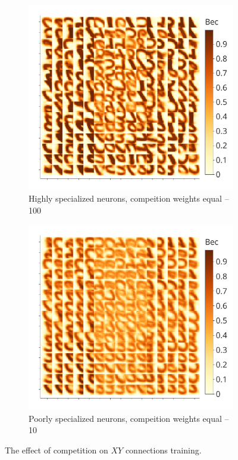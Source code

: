 \documentclass[a4paper]{article}
\begin{document}
\begin{figure}
\centering
\begin{subfigure}{0.45\textwidth}
    \includegraphics[width=\textwidth,keepaspectratio=true]{weights_XY_good_ru.pdf}
    \caption{Highly specialized neurons, compeition weights equal --100}
    \label{fig:high_comp}
\end{subfigure}
\begin{subfigure}{0.45\textwidth}
    \includegraphics[width=\textwidth,keepaspectratio=true]{weights_XY_bad_ru.pdf}
    \caption{Poorly specialized neurons, compeition weights equal --10}
    \label{fig:low_comp}
\end{subfigure}
\caption{The effect of competition on $ XY $ connections training.}
\label{competition-training-importance}
\end{figure}
\end{document}
